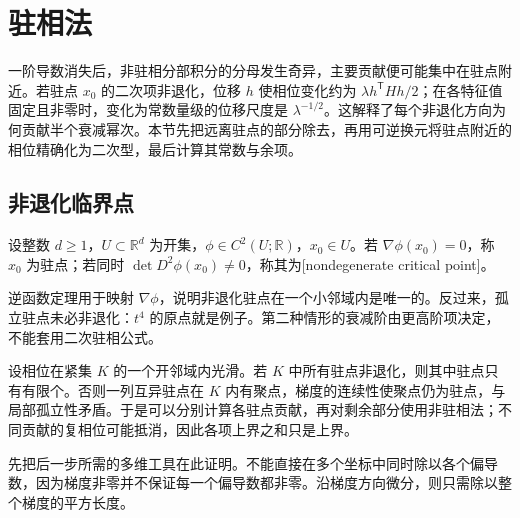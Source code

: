 \section{驻相法}
\label{b2:sec:2102}

一阶导数消失后，非驻相分部积分的分母发生奇异，主要贡献便可能集中在驻点附近。若驻点 \(x_0\) 的二次项非退化，位移 \(h\) 使相位变化约为 \(\lambda h^{\mathsf T}Hh/2\)；在各特征值固定且非零时，变化为常数量级的位移尺度是 \(\lambda^{-1/2}\)。这解释了每个非退化方向为何贡献半个衰减幂次。本节先把远离驻点的部分除去，再用可逆换元将驻点附近的相位精确化为二次型，最后计算其常数与余项。

\subsection{非退化临界点}
\label{b2:subsec:210201}

\begin{definition}\label{b2:def:21-critical}
设整数 \(d\geq1\)，\(U\subset\mathbb R^d\) 为开集，\(\phi\in C^2(U;\mathbb R)\)，\(x_0\in U\)。若 \(\nabla\phi(x_0)=0\)，称 \(x_0\) 为驻点；若同时
\(\det D^2\phi(x_0)\ne0\)，称其为[nondegenerate critical point]。
\end{definition}
逆函数定理用于映射 \(\nabla\phi\)，说明非退化驻点在一个小邻域内是唯一的。反过来，孤立驻点未必非退化：\(t^4\) 的原点就是例子。第二种情形的衰减阶由更高阶项决定，不能套用二次驻相公式。

\ProseParagraphBreak
设相位在紧集 \(K\) 的一个开邻域内光滑。若 \(K\) 中所有驻点非退化，则其中驻点只有有限个。否则一列互异驻点在 \(K\) 内有聚点，梯度的连续性使聚点仍为驻点，与局部孤立性矛盾。于是可以分别计算各驻点贡献，再对剩余部分使用非驻相法；不同贡献的复相位可能抵消，因此各项上界之和只是上界。

\ProseParagraphBreak

先把后一步所需的多维工具在此证明。不能直接在多个坐标中同时除以各个偏导数，因为梯度非零并不保证每一个偏导数都非零。沿梯度方向微分，则只需除以整个梯度的平方长度。

